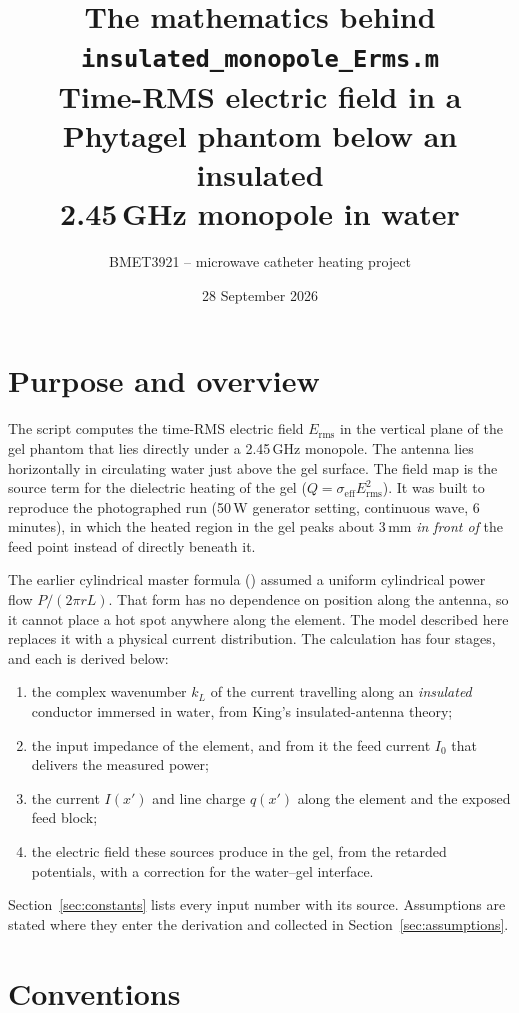 \documentclass[11pt,a4paper]{article}
\title{The mathematics behind \texttt{insulated\_monopole\_Erms.m}\\[4pt]
\large Time-RMS electric field in a Phytagel phantom below an insulated\\ 2.45\,GHz monopole in water}
\author{BMET3921 -- microwave catheter heating project}
\date{28 September 2026}
\newcommand{\Erms}{E_{\mathrm{rms}}}
\begin{document}
\maketitle

\section{Purpose and overview}

The script  computes the
time-RMS electric field $\Erms$ in the vertical plane of the gel phantom that lies directly under a
2.45\,GHz monopole. The antenna lies horizontally in circulating water just above the gel surface. The field
map is the source term for the dielectric heating of the gel ($Q=\sigma_{\text{eff}}\Erms^2$). It was built to
reproduce the photographed run (50\,W generator setting, continuous wave, 6 minutes), in which the heated
region in the gel peaks about 3\,mm \emph{in front of} the feed point instead of directly beneath it.

The earlier cylindrical master formula () assumed
a uniform cylindrical power flow $P/(2\pi r L)$. That form has no dependence on position along the antenna,
so it cannot place a hot spot anywhere along the element. The model described here replaces it with a
physical current distribution. The calculation has four stages, and each is derived below:
\begin{enumerate}
  \item the complex wavenumber $k_L$ of the current travelling along an \emph{insulated} conductor
        immersed in water, from King's insulated-antenna theory;
  \item the input impedance of the element, and from it the feed current $I_0$ that delivers the
        measured power;
  \item the current $I(x')$ and line charge $q(x')$ along the element and the exposed feed block;
  \item the electric field these sources produce in the gel, from the retarded potentials, with a
        correction for the water--gel interface.
\end{enumerate}
Section~\ref{sec:constants} lists every input number with its source. Assumptions are stated where
they enter the derivation and collected in Section~\ref{sec:assumptions}.

\section{Conventions}\label{sec:conventions}
\end{document}
